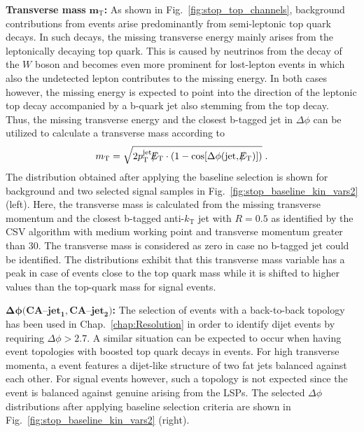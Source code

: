 \begin{description}
 \item \textbf{Transverse mass} $\mathbf{m_\mathrm{T}}$\textbf{:} As shown in Fig.~\ref{fig:stop_top_channels}, background contributions from \ttbar events arise predominantly from semi-leptonic top quark decays. In such decays, the missing transverse energy mainly arises from the leptonically decaying top quark. This is caused by neutrinos from the decay of the $W$ boson and becomes even more prominent for lost-lepton events in which also the undetected lepton contributes to the missing energy. In both cases however, the missing energy is expected to point into the direction of the leptonic top decay accompanied by a b-quark jet also stemming from the top decay. \\
Thus, the missing transverse energy and the closest b-tagged jet in $\Delta \phi$ can be utilized to calculate a transverse mass according to
\begin{equation}
m_\mathrm{T} = \sqrt{2 p_{\text{T}}^\mathrm{jet}\slash\mkern-12mu{E}_{\text{T}} \cdot (1-\mathrm{cos}[\Delta \phi(\mathrm{jet}, \slash\mkern-12mu{E}_{\text{T}})])} \; .
\end{equation}   
The distribution obtained after applying the baseline selection is shown for background and two selected signal samples in Fig.~\ref{fig:stop_baseline_kin_vars2} (left). Here, the transverse mass is calculated from the missing transverse momentum and the closest b-tagged anti-$k_\mathrm{T}$ jet with $R = 0.5$ as identified by the CSV algorithm with medium working point and transverse momentum greater than 30\gev. The transverse mass is considered as zero in case no b-tagged jet could be identified. The distributions exhibit that this transverse mass variable has a peak in case of \ttbar events close to the top quark mass while it is shifted to higher values than the top-quark mass for signal events. 
 \item $\mathbf{\Delta \phi(CA}$--$\mathbf{jet_1, CA}$--$\mathbf{jet_2)}$\textbf{:} The selection of events with a back-to-back topology has been used in Chap.~\ref{chap:Resolution} in order to identify dijet events by requiring $\Delta \phi > 2.7$. A similar situation can be expected to occur when having event topologies with boosted top quark decays in \ttbar events. For high transverse momenta, a \ttbar event features a dijet-like structure of two fat jets balanced against each other. For signal events however, such a topology is not expected since the event is balanced against genuine \met arising from the LSPs. The selected $\Delta \phi$ distributions after applying baseline selection criteria are shown in Fig.~\ref{fig:stop_baseline_kin_vars2} (right).  
\end{description}

